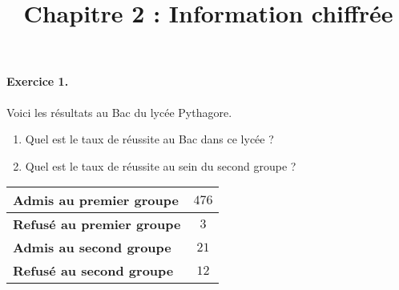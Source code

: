 \documentclass[11pt]{article}
\title{Chapitre 2 : Information chiffrée}
\date{}
\author{}
\begin{document}

\paragraph{Exercice 1.} Voici les résultats au Bac du lycée Pythagore.\\
\begin{minipage}{.5\textwidth}
  \begin{enumerate}
    \item Quel est le taux de réussite au Bac dans ce lycée ?
    \item Quel est le taux de réussite au sein du second groupe ?
  \end{enumerate}
\end{minipage}
\begin{minipage}{.5\textwidth}
  \begin{center}
\renewcommand{\arraystretch}{1.5}
  \begin{tabular}[]{|l|c|}
    \hline
    \textbf{Admis au premier groupe} & $476$ \\
    \hline
    \textbf{Refusé au premier groupe} & $3$ \\
    \hline
    \textbf{Admis au second groupe} & $21$ \\
    \hline
    \textbf{Refusé au second groupe} & $12$ \\
    \hline
  \end{tabular}
  \end{center}
\end{minipage}
\end{document}
